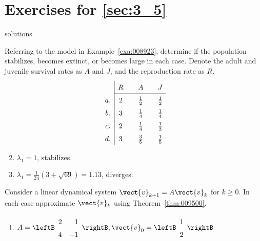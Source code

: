 \section*{Exercises for \ref{sec:3_5}}

\begin{Filesave}{solutions}
\end{Filesave}

\begin{multicols}{2}


\begin{ex}
Referring to the model in Example~\ref{exa:008923},
 determine if the population stabilizes, becomes extinct, or becomes 
large in each case. Denote the adult and juvenile survival rates as $A$ and $J$, and the reproduction rate as $R$.
\begin{equation*}
\def\arraystretch{1.5}  \begin{array}{c|ccccc}
& R & & A & & J \\ \cline{2-6}
a. & 2 & & \frac{1}{2} & &\frac{1}{2}\\
b. & 3 & &\frac{1}{4} & &\frac{1}{4}\\
c. & 2 & &\frac{1}{4} & &\frac{1}{3}\\
d. & 3 & &\frac{3}{5} & &\frac{1}{5}
\end{array}
\end{equation*}
\begin{sol}
\begin{enumerate}[label={\alph*.}]
\setcounter{enumi}{1}
\item  $\lambda_{1} = 1$, stabilizes.

\setcounter{enumi}{3}
\item  $\lambda_1 = \frac{1}{24} (3+\sqrt{69}) = 1.13$, diverges.

\end{enumerate}
\end{sol}
\end{ex}

  
\begin{ex}
Consider a linear dynamical system $\vect{v}_{k+1} = A\vect{v}_{k}$ for $k \geq 0$. In each case approximate $\vect{v}_{k}$ using Theorem~\ref{thm:009500}.


\begin{enumerate}[label={\alph*.}]
\item $A = \leftB \begin{array}{rr}
2 & 1 \\
4 & -1 
\end{array}\rightB, \vect{v}_0 = \leftB \begin{array}{r}
1 \\
2
\end{array}\rightB$



\end{enumerate}
\end{ex}
\end{multicols}

